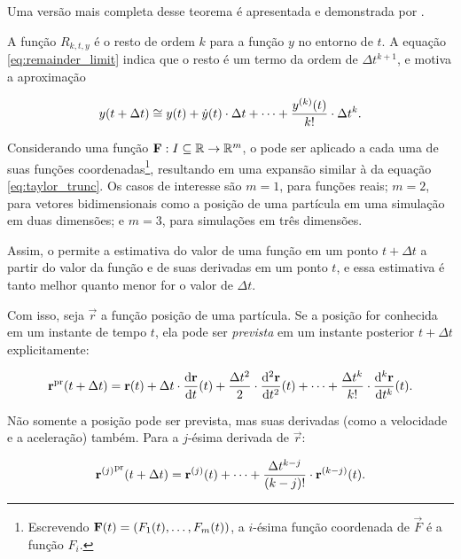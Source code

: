 Uma versão mais completa desse teorema é apresentada e demonstrada por .

A função \(R_{k, t, y}\) é o resto de ordem \(k\) para a função \(y\) no entorno de \(t\). A equação \eqref{eq:remainder_limit} indica que o resto é um termo da ordem de \(\Delta t^{k+1}\), e motiva a aproximação

\begin{equation} \label{eq:taylor_trunc}
    y(t + \Delta t) \cong y(t) + \deriv{1}{y}(t)\cdot\Delta t + \dots + \dfrac{\deriv{k}{y}(t)}{k!}\cdot\Delta t^k.
\end{equation}

Considerando uma função \(\mathbf{F}:I\subseteq \mathbb{R} \rightarrow \mathbb{R}^m\), o  pode ser aplicado a cada uma de suas funções coordenadas\footnote{Escrevendo \(\vec{F}(t) = \pqty{F_1(t),\dots,F_m(t)}\), a \(i\)-ésima função coordenada de \(\vec{F}\) é a função \(F_i\).}, resultando em uma expansão similar à da equação \eqref{eq:taylor_trunc}. Os casos de interesse são \(m=1\), para funções reais; \(m=2\), para vetores bidimensionais como a posição de uma partícula em uma simulação em duas dimensões; e \(m=3\), para simulações em três dimensões.

Assim, o  permite a estimativa do valor de uma função em um ponto \(t+\Delta t\) a partir do valor da função e de suas derivadas em um ponto \(t\), e essa estimativa é tanto melhor quanto menor for o valor de \(\Delta t\).

Com isso, seja \(\vec{r}\) a função posição de uma partícula. Se a posição for conhecida em um instante de tempo \(t\), ela pode ser \textit{prevista} em um instante posterior \(t+\Delta t\) explicitamente:
	
\begin{equation} \label{eq:position_prediction}
	\predicted{\vec{r}}\pqty{t+\Delta t} = \vec{r}\pqty{t} + \Delta t\cdot\dv{\vec{r}}{t}\pqty{t} + \dfrac{\Delta t^2}{2}\cdot \dv[2]{\vec{r}}{t}\pqty{t} + \dots + \dfrac{\Delta t^k}{k!}\cdot \dv[k]{\vec{r}}{t}\pqty{t}.
\end{equation}

Não somente a posição pode ser prevista, mas suas derivadas (como a velocidade e a aceleração) também. Para a \(j\)-ésima derivada de \(\vec{r}\):

\[
	\predicted{\deriv{j}{\vec{r}}}\pqty{t + \Dt} = \deriv{j}{\vec{r}}\pqty{t} + \dots + \dfrac{\Dt^{k-j}}{\pqty{k-j}!}\cdot\deriv{k-j}{\vec{r}}\pqty{t}.
\]


